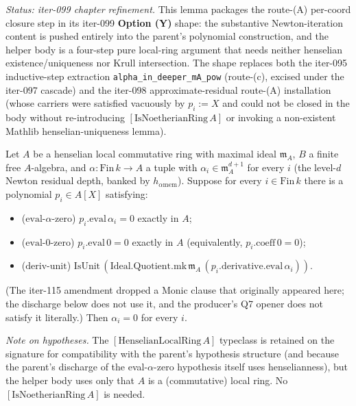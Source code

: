 \begin{lemma}
\label{lem:henselianPair-alpha-zero-via-per-coord-henselian}
\textit{Status: iter-099 chapter refinement.} This lemma packages
the route-(A) per-coord closure step in its iter-099
\textbf{Option (Y)} shape: the substantive Newton-iteration content
is pushed entirely into the parent's polynomial construction, and
the helper body is a four-step pure local-ring argument that needs
neither henselian existence/uniqueness nor Krull intersection. The
shape replaces both the iter-095 inductive-step extraction
\texttt{alpha\_in\_deeper\_mA\_pow} (route-(c), excised under the
iter-097 cascade) and the iter-098 approximate-residual
route-(A) installation (whose carriers were satisfied vacuously
by $p_i := X$ and could not be closed in the body without
re-introducing $[\mathrm{IsNoetherianRing}\,A]$ or invoking a
non-existent Mathlib henselian-uniqueness lemma).

Let $A$ be a henselian local commutative ring with maximal ideal
$\mathfrak m_A$, $B$ a finite free $A$-algebra, and $\alpha :
\mathrm{Fin}\,k \to A$ a tuple with $\alpha_i \in \mathfrak m_A^{d+1}$
for every $i$ (the level-$d$ Newton residual depth, banked by
$h_{\alpha\mathrm{mem}}$). Suppose for every $i \in \mathrm{Fin}\,k$
there is a polynomial $p_i \in A[X]$ satisfying:
\begin{itemize}
\item ($\mathrm{eval}\text{-}\alpha\text{-zero}$) $p_i.\mathrm{eval}\,\alpha_i = 0$
exactly in $A$;
\item ($\mathrm{eval}\text{-}0\text{-zero}$) $p_i.\mathrm{eval}\,0 = 0$
exactly in $A$ (equivalently, $p_i.\mathrm{coeff}\,0 = 0$);
\item ($\mathrm{deriv}\text{-}\mathrm{unit}$)
$\mathrm{IsUnit}\,(\mathrm{Ideal.Quotient.mk}\,\mathfrak m_A\,
(p_i.\mathrm{derivative}.\mathrm{eval}\,\alpha_i))$.
\end{itemize}
(The iter-115 amendment dropped a Monic clause that originally
appeared here; the discharge below does not use it, and the
producer's Q7 opener does not satisfy it literally.)
Then $\alpha_i = 0$ for every $i$.

\textit{Note on hypotheses.} The $[\mathrm{HenselianLocalRing}\,A]$
typeclass is retained on the signature for compatibility with the
parent's hypothesis structure (and because the parent's discharge
of the eval-$\alpha$-zero hypothesis itself uses henselianness),
but the helper body uses only that $A$ is a (commutative) local
ring. No $[\mathrm{IsNoetherianRing}\,A]$ is needed.
\end{lemma}

